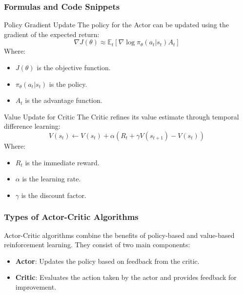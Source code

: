 \documentclass[aspectratio=169]{beamer}
\begin{document}
\begin{frame}[fragile]
    \frametitle{Formulas and Code Snippets}
    \begin{block}{Policy Gradient Update}
        The policy for the Actor can be updated using the gradient of the expected return:
        \begin{equation}
            \nabla J(\theta) \approx \mathbb{E}_t \left[ \nabla \log \pi_{\theta}(a_t | s_t) A_t \right]
        \end{equation}
        Where:
        \begin{itemize}
            \item $J(\theta)$ is the objective function.
            \item $\pi_{\theta}(a_t | s_t)$ is the policy.
            \item $A_t$ is the advantage function.
        \end{itemize}
    \end{block}

    \begin{block}{Value Update for Critic}
        The Critic refines its value estimate through temporal difference learning:
        \begin{equation}
            V(s_t) \gets V(s_t) + \alpha (R_t + \gamma V(s_{t+1}) - V(s_t))
        \end{equation}
        Where:
        \begin{itemize}
            \item $R_t$ is the immediate reward.
            \item $\alpha$ is the learning rate.
            \item $\gamma$ is the discount factor.
        \end{itemize}
    \end{block}
\end{frame}

\begin{frame}[fragile]
    \frametitle{Types of Actor-Critic Algorithms}
    Actor-Critic algorithms combine the benefits of policy-based and value-based reinforcement learning. They consist of two main components:
    \begin{itemize}
        \item \textbf{Actor}: Updates the policy based on feedback from the critic.
        \item \textbf{Critic}: Evaluates the action taken by the actor and provides feedback for improvement.
    \end{itemize}
\end{frame}
\end{document}
